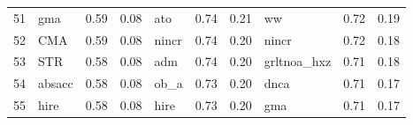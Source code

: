 \documentclass[12pt]{article}
\begin{document}
\begin{landscape}
\begin{footnotesize}
\begin{longtable}{l|lcc|lcc|lcc}
			51                    & gma                         & 0.59                                                                                 & 0.08                            & ato                         & 0.74                                                                                 & 0.21                            & ww                          & 0.72                                                                                 & 0.19                           \\
			52                    & CMA                         & 0.59                                                                                 & 0.08                            & nincr                       & 0.74                                                                                 & 0.20                            & nincr                       & 0.72                                                                                 & 0.18                           \\
			53                    & STR                         & 0.58                                                                                 & 0.08                            & adm                         & 0.74                                                                                 & 0.20                            & grltnoa\_hxz                & 0.71                                                                                 & 0.18                           \\
			54                    & absacc                      & 0.58                                                                                 & 0.08                            & ob\_a                       & 0.73                                                                                 & 0.20                            & dnca                        & 0.71                                                                                 & 0.17                           \\
			55                    & hire                        & 0.58                                                                                 & 0.08                            & hire                        & 0.73                                                                                 & 0.20                            & gma                         & 0.71                                                                                 & 0.17                           \\

\end{longtable}
\end{footnotesize}
\end{landscape}
\end{document}

